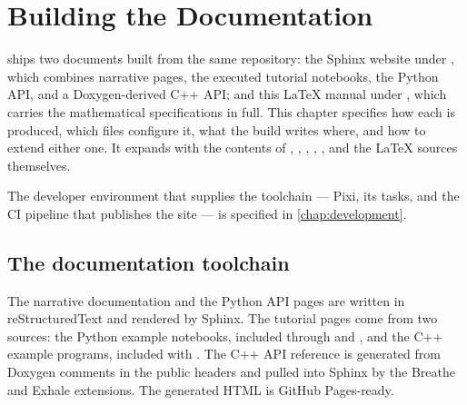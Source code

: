 \chapter{Building the Documentation}
\label{chap:building-docs}

\lupnt{} ships two documents built from the same repository: the Sphinx
website under , which combines narrative pages, the executed
tutorial notebooks, the Python API, and a Doxygen-derived C++ API; and this
LaTeX manual under , which carries the mathematical
specifications in full. This chapter specifies how each is produced, which
files configure it, what the build writes where, and how to extend either one.
It expands  with the contents of
, , ,
, , and the LaTeX sources
themselves.

The developer environment that supplies the toolchain --- Pixi, its tasks, and
the CI pipeline that publishes the site --- is specified in
\cref{chap:development}.

\section{The documentation toolchain}
\label{sec:bd-toolchain}

The narrative documentation and the Python API pages are written in
reStructuredText and rendered by Sphinx. The tutorial pages come from two
sources: the Python example notebooks, included through  and
, and the C++ example programs, included with
. The C++ API reference is generated from Doxygen
comments in the public headers and pulled into Sphinx by the Breathe and Exhale
extensions. The generated HTML is GitHub Pages-ready.

